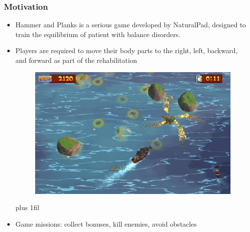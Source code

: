 \documentclass[xcolor=table]{beamer}
\makeatletter
\def\normaljustify{%
  \let\\\@centercr\rightskip\z@skip \leftskip\z@skip%
  \parfillskip=0pt plus 1fil}
\makeatother
\begin{document}
\begin{frame}
\frametitle{Motivation}
\centering

\begin{itemize}
\item Hammer and Planks is a serious game developed by NaturalPad, designed to train the equilibrium of patient with balance disorders.\\
\item Players are required to move their body parts to the right, left, backward, and forward as part of the rehabilitation\\
\begin{figure}
\includegraphics[scale=0.16]{images/hp_game.png}
\end{figure}
\normaljustify
{}\item Game missions: collect bonuses, kill enemies, avoid obstacles
\end{itemize}

\end{frame}
\end{document}
